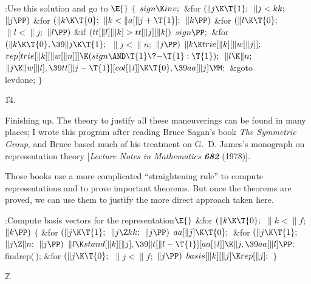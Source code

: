 \B{}:Use this solution and go to %
\X${}\E{}$\6
${}\{{}$\1\6
${}\\{sign}\K\\{inv};{}$\6
\&{for} ${}(\|j\K\T{1};{}$ ${}\|j<\\{kk};{}$ ${}\|j\PP){}$\1\6
\&{for} ${}(\|k\K\T{0};{}$ ${}\|k<\|a[\|j+\T{1}];{}$ ${}\|k\PP){}$\1\6
\&{for} ${}(\|l\K\T{0};{}$ ${}\|l<\|j;{}$ ${}\|l\PP){}$\1\6
\&{if} ${}(\\{tt}[\|l][\|k]>\\{tt}[\|j][\|k]){}$\1\5
${}\\{sign}\PP;{}$\2\2\2\2\6
\&{for} ${}(\|k\K\T{0},\39\|j\K\T{1};{}$ ${}\|j<\|n;{}$ ${}\|j\PP){}$\1\5
${}\|k\K\\{trie}[\|k][\|w[\|j]];{}$\2\6
${}\\{rep}[\\{trie}[\|k][\|w[\|n]]]\K(\\{sign}\AND\T{1}\?{-}\T{1}:\T{1});{}$\6
${}\|l\K\|n;{}$\6
${}\|j\K\|w[\|l],\39\\{tt}[\|j-\T{1}][\\{col}[\|l]]\K\T{0},\39\\{aa}[\|j]%
\MM;{}$\6
\&{goto} \\{levdone};\6
\4${}\}{}$\2\par
\U14.\fi

Finishing up. The theory to justify all these
maneuverings can
be found in many places; I wrote this program after reading
Bruce Sagan's book {\sl The Symmetric Group}, and Bruce based much of
his treatment on G.~D. James's monograph on representation theory
[{\sl Lecture Notes in Mathematics\/ \bf682} (1978)].

Those books use a more complicated ``straightening rule'' to compute
representations and to prove important theorems. But once the theorems are
proved, we can use them to justify the more direct approach taken here.

\Y\B\4:Compute  basis vectors for the representation\X${}\E{}$\6
\&{for} ${}(\|k\K\T{0};{}$ ${}\|k<\|f;{}$ ${}\|k\PP){}$\5
${}\{{}$\1\6
\&{for} ${}(\|j\K\T{1};{}$ ${}\|j\Z\\{kk};{}$ ${}\|j\PP){}$\1\5
${}\\{aa}[\|j]\K\T{0};{}$\2\6
\&{for} ${}(\|j\K\T{1};{}$ ${}\|j\Z\|n;{}$ ${}\|j\PP){}$\1\5
${}\|l\K\\{stand}[\|k][\|j],\39\|t[\|l-\T{1}][\\{aa}[\|l]]\K\|j,\39\\{aa}[\|l]%
\PP;{}$\2\6
\\{findrep}(\,);\6
\&{for} ${}(\|j\K\T{0};{}$ ${}\|j<\|f;{}$ ${}\|j\PP){}$\1\5
${}\\{basis}[\|k][\|j]\K\\{rep}[\|j];{}$\2\6
\4${}\}{}$\2\par
\U2.\fi

